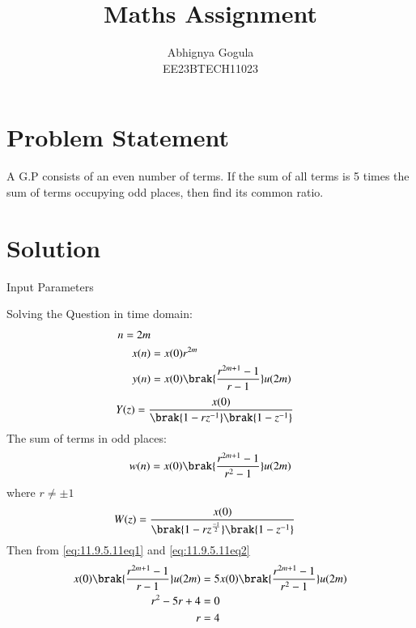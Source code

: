 \documentclass[journal,12pt,twocolumn]{IEEEtran}
\theoremstyle{remark}
\begin{document}

\title{Maths Assignment}
\author{Abhignya Gogula\\
        EE23BTECH11023}
\maketitle
\section*{Problem Statement}
A G.P consists of an even number of terms. If the sum of all terms is 5 times the sum of terms occupying odd places, then find its common ratio.
\section*{Solution}
\begin{table}[h!]
\centering

\caption{Input Parameters}
\label{11.9.5.11tab1}
\end{table}
Solving the Question in time domain:
\begin{align}
n=2m\\
x(n) &= x(0)r^{2m} \\
y(n) &= x(0)\brak{\frac{r^{2m+1}-1}{r-1}}u(2m)
\label{eq:11.9.5.11eq1}
\end{align}
\begin{align}
Y(z) &= \frac{x(0)}{\brak{1-rz^{-1}}\brak{1-z^{-1}}}
\end{align}
The sum of terms in odd places:
\begin{equation}
w(n) = x(0)\brak{\frac{r^{2m+1}-1}{r^2-1}}u(2m)
\label{eq:11.9.5.11eq2}
\end{equation}
where $r \neq \pm 1$
\begin{align}
W(z) &= \frac{x(0)}{\brak{1-rz^{\frac{-1}{2}}}\brak{1-z^{-1}}}
\end{align}
Then from \eqref{eq:11.9.5.11eq1} and \eqref{eq:11.9.5.11eq2}
\begin{align}
x(0)\brak{\frac{r^{2m+1}-1}{r-1}}u(2m) &= 5x(0)\brak{\frac{r^{2m+1}-1}{r^2-1}}u(2m)\\
r^2-5r+4 &= 0\\
r &= 4
\end{align}
\end{document}
